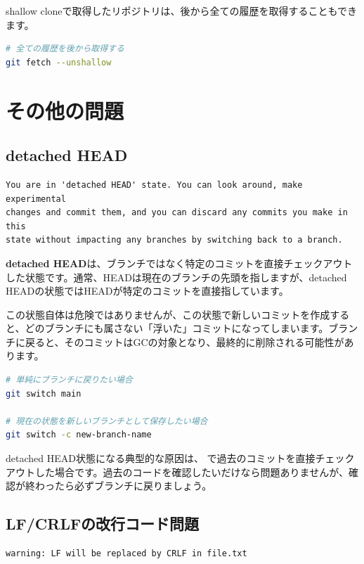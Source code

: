 shallow cloneで取得したリポジトリは、後から全ての履歴を取得することもできます。

\begin{lstlisting}[language=bash]
# 全ての履歴を後から取得する
git fetch --unshallow
\end{lstlisting}

\section{その他の問題}

\subsection{detached HEAD}

\begin{lstlisting}[language={}]
You are in 'detached HEAD' state. You can look around, make experimental
changes and commit them, and you can discard any commits you make in this
state without impacting any branches by switching back to a branch.
\end{lstlisting}

\textbf{detached HEAD}は、ブランチではなく特定のコミットを直接チェックアウトした状態です。通常、HEADは現在のブランチの先頭を指しますが、detached HEADの状態ではHEADが特定のコミットを直接指しています。

この状態自体は危険ではありませんが、この状態で新しいコミットを作成すると、どのブランチにも属さない「浮いた」コミットになってしまいます。ブランチに戻ると、そのコミットはGCの対象となり、最終的に削除される可能性があります。

\begin{lstlisting}[language=bash]
# 単純にブランチに戻りたい場合
git switch main

# 現在の状態を新しいブランチとして保存したい場合
git switch -c new-branch-name
\end{lstlisting}

detached HEAD状態になる典型的な原因は、 で過去のコミットを直接チェックアウトした場合です。過去のコードを確認したいだけなら問題ありませんが、確認が終わったら必ずブランチに戻りましょう。

\subsection{LF/CRLFの改行コード問題}

\begin{lstlisting}[language={}]
warning: LF will be replaced by CRLF in file.txt
\end{lstlisting}

